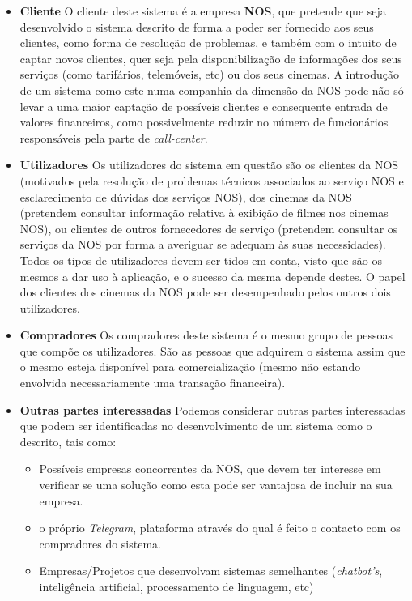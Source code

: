 \documentclass[11pt,a4paper]{article}
\begin{document}
\begin{itemize}
    \item \textbf{Cliente}\newline
    O cliente deste sistema é a empresa \textbf{NOS}, que pretende que seja desenvolvido o sistema descrito
    de forma a poder ser fornecido aos seus clientes, como forma de resolução de problemas, e também com o
    intuito de captar novos clientes, quer seja pela disponibilização de informações dos seus serviços (como
    tarifários, telemóveis, etc) ou dos seus cinemas. A introdução de um sistema como este numa companhia da
    dimensão da NOS pode não só levar a uma maior captação de possíveis clientes e consequente entrada de
    valores financeiros, como possivelmente reduzir no número de funcionários responsáveis pela parte de
    \emph{call-center}.
    \item \textbf{Utilizadores}\newline
    Os utilizadores do sistema em questão são os clientes da NOS (motivados pela resolução de problemas
    técnicos associados ao serviço NOS e esclarecimento de dúvidas dos serviços NOS), dos cinemas da NOS
    (pretendem consultar informação relativa à exibição de filmes nos cinemas NOS), ou clientes
    de outros fornecedores de serviço (pretendem consultar os serviços da NOS por forma a averiguar se 
    adequam às suas necessidades). Todos os tipos de utilizadores devem ser tidos em conta, visto que são os
    mesmos a dar uso à aplicação, e o sucesso da mesma depende destes. O papel dos clientes dos cinemas da NOS
    pode ser desempenhado pelos outros dois utilizadores.
    \item \textbf{Compradores}\newline
    Os compradores deste sistema é o mesmo grupo de pessoas que compõe os utilizadores. São as pessoas que adquirem o sistema assim que o mesmo esteja disponível
    para comercialização (mesmo não estando envolvida necessariamente uma transação financeira).
    \item \textbf{Outras partes interessadas}\newline
    Podemos considerar outras partes interessadas que podem ser identificadas no desenvolvimento de um
    sistema como o descrito, tais como:
    \begin{itemize}
        \item Possíveis empresas concorrentes da NOS, que devem ter interesse em verificar se uma solução
        como esta pode ser vantajosa de incluir na sua empresa.
        \item o próprio \emph{Telegram}, plataforma através do qual é feito o contacto com os compradores do
        sistema.
        \item Empresas/Projetos que desenvolvam sistemas semelhantes (\emph{chatbot's}, inteligência
        artificial, processamento de linguagem, etc)
    \end{itemize}
    
\end{itemize}
\end{document}
